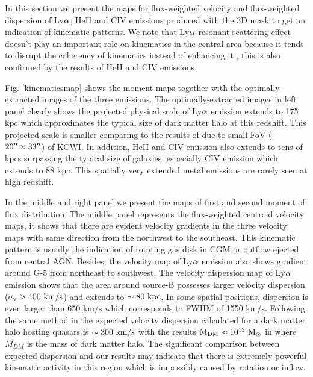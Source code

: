 \documentclass[../Results.tex]{subfiles}
\begin{document}
In this section we present the maps for flux-weighted velocity and flux-weighted dispersion of Ly$\rm \alpha$, HeII and CIV emissions produced with the 3D mask to get an indication of kinematic patterns. We note that Ly$\rm \alpha$ resonant scattering effect doesn't play an important role on kinematics in the central area because it tends to disrupt the coherency of kinematics instead of enhancing it \citep{Cantalupo2005Fluorescent}, this is also confirmed by the results of HeII and CIV emissions.

Fig. \ref{kinematicsmap} shows the moment maps together with the optimally-extracted images of the three emissions. The optimally-extracted images in left panel clearly shows the projected physical scale of Ly$\rm \alpha$ emission extends to 175 kpc which approximates the typical size of dark matter halo at this redshift. This projected scale is smaller comparing to the results of \citet{cai2017discovery} due to small FoV ($\rm 20\mbox{$^{\prime\prime}$} \times 33\mbox{$^{\prime\prime}$}$) of KCWI. In addition, HeII and CIV emission also extends to tens of kpcs surpassing the typical size of galaxies, especially CIV emission which extends to 88 kpc. This spatially very extended metal emissions are rarely seen at high redshift.

In the middle and right panel we present the maps of first and second moment of flux distribution. The middle panel represents the flux-weighted centroid velocity maps, it shows that there are evident velocity gradients in the three velocity maps with same direction from the northwest to the southeast. This kinematic pattern is usually the indication of rotating gas disk in CGM or outflow ejected from central AGN. Besides, the velocity map of Ly$\rm \alpha$ emission also shows gradient around G-5 from northeast to southwest.  The velocity dispersion map of Ly$\rm \alpha$ emission shows that the area around source-B possesses larger velocity dispersion ($\rm \sigma_{v} > 400 \ km/s$) and extends to $\rm \sim 80 \ kpc$. In some spatial positions, dispersion is even larger than 650 km/s which corresponds to FWHM of 1550 km/s. Following the same method in \citet{Arrigoni_Battaia_2018} the expected velocity dispersion calculated for a dark matter halo hosting quasars is $\rm \sim 300 \ km/s$ with the results $\rm M_{DM} \approx 10^{13} \ M_{\odot}$ in \citet{cai2017discovery} where $M_{DM}$ is the mass of dark matter halo. The significant comparison between expected dispersion and our results may indicate that there is extremely powerful kinematic activity in this region which is impossibly caused by rotation or inflow.
\end{document}
